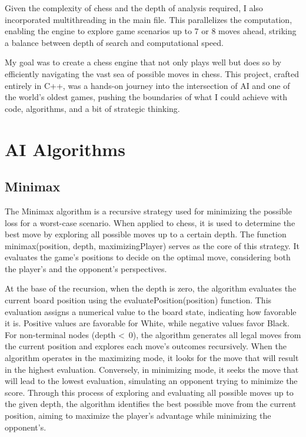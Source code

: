 \documentclass{article}
\begin{document}
Given the complexity of chess and the depth of analysis required, I also incorporated multithreading in the main file. This parallelizes the computation, enabling the engine to explore game scenarios up to 7 or 8 moves ahead, striking a balance between depth of search and computational speed.

My goal was to create a chess engine that not only plays well but does so by efficiently navigating the vast sea of possible moves in chess. This project, crafted entirely in C++, was a hands-on journey into the intersection of AI and one of the world's oldest games, pushing the boundaries of what I could achieve with code, algorithms, and a bit of strategic thinking.
%

\pagebreak

\section{AI Algorithms}
\subsection{Minimax}

The Minimax algorithm is a recursive strategy used for minimizing the possible loss for a worst-case scenario. When applied to chess, it is used to determine the best move by exploring all possible moves up to a certain depth. The function minimax(position, depth, maximizingPlayer) serves as the core of this strategy. It evaluates the game's positions to decide on the optimal move, considering both the player's and the opponent's perspectives.

At the base of the recursion, when the depth is zero, the algorithm evaluates the current board position using the evaluatePosition(position) function. This evaluation assigns a numerical value to the board state, indicating how favorable it is. Positive values are favorable for White, while negative values favor Black. For non-terminal nodes (depth \textless \   0), the algorithm generates all legal moves from the current position and explores each move's outcomes recursively. When the algorithm operates in the maximizing mode, it looks for the move that will result in the highest evaluation. Conversely, in minimizing mode, it seeks the move that will lead to the lowest evaluation, simulating an opponent trying to minimize the score. Through this process of exploring and evaluating all possible moves up to the given depth, the algorithm identifies the best possible move from the current position, aiming to maximize the player's advantage while minimizing the opponent's.
\end{document}
